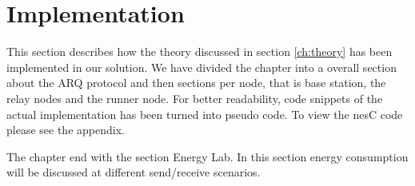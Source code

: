 \section{Implementation}\label{ch:implementation}

This section describes how the theory discussed in section \ref{ch:theory} has been implemented in our solution. We have divided the chapter into a overall section about the ARQ protocol and then sections per node, that is base station, the relay nodes and the runner node. For better readability, code snippets of the actual implementation has been turned into pseudo code. To view the nesC code please see the appendix.

\noindent The chapter end with the section Energy Lab. In this section energy consumption will be discussed at different send/receive scenarios.









